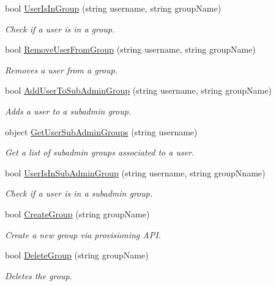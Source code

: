 \begin{DoxyCompactItemize}
bool \hyperlink{classowncloudsharp_1_1_client_a4c82896a96502650ab217cbf55342157}{User\+Is\+In\+Group} (string username, string group\+Name)
\begin{DoxyCompactList}\small\item\em Check if a user is in a group. \end{DoxyCompactList}\item 
bool \hyperlink{classowncloudsharp_1_1_client_a8c2bcb8ca08d661bb4c15b8cc07eaf5d}{Remove\+User\+From\+Group} (string username, string group\+Name)
\begin{DoxyCompactList}\small\item\em Removes a user from a group. \end{DoxyCompactList}\item 
bool \hyperlink{classowncloudsharp_1_1_client_a99a393c20b57e50c10ee337b09ed75b3}{Add\+User\+To\+Sub\+Admin\+Group} (string username, string group\+Name)
\begin{DoxyCompactList}\small\item\em Adds a user to a subadmin group. \end{DoxyCompactList}\item 
object \hyperlink{classowncloudsharp_1_1_client_aef2ea7c0321e3094867f456df6929e47}{Get\+User\+Sub\+Admin\+Groups} (string username)
\begin{DoxyCompactList}\small\item\em Get a list of subadmin groups associated to a user. \end{DoxyCompactList}\item 
bool \hyperlink{classowncloudsharp_1_1_client_aa3e28e78df6a8e1ddb2f92fa2b1929c5}{User\+Is\+In\+Sub\+Admin\+Group} (string username, string group\+Nname)
\begin{DoxyCompactList}\small\item\em Check if a user is in a subadmin group. \end{DoxyCompactList}\item 
bool \hyperlink{classowncloudsharp_1_1_client_ae3f6b18765fa47eed193eae4db94ae2c}{Create\+Group} (string group\+Name)
\begin{DoxyCompactList}\small\item\em Create a new group via provisioning A\+P\+I. \end{DoxyCompactList}\item 
bool \hyperlink{classowncloudsharp_1_1_client_a83390a9710020ecc7513dd03a23e192f}{Delete\+Group} (string group\+Name)
\begin{DoxyCompactList}\small\item\em Deletes the group. \end{DoxyCompactList}\item 

\end{DoxyCompactItemize}
